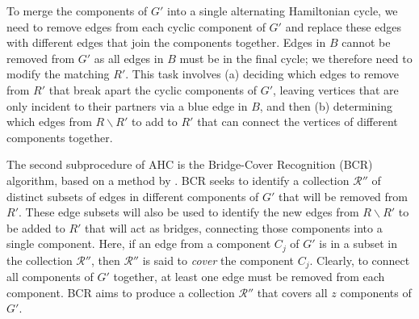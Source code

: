 \documentclass[a4paper,11pt,authoryear]{elsarticle}
\begin{document}
\noindent To merge the components of $G'$ into a single alternating Hamiltonian cycle, we need to remove edges from each cyclic component of $G'$ and replace these edges with different edges that join the components together. Edges in $B$ cannot be removed from $G'$ as all edges in $B$ must be in the final cycle; we therefore need to modify the matching $R'$. This task involves (a) deciding which edges to remove from $R'$ that break apart the cyclic components of $G'$, leaving vertices that are only incident to their partners via a blue edge in $B$, and then (b) determining which edges from $R\backslash R'$ to add to $R'$ that can connect the vertices of different components together.

The second subprocedure of AHC is the Bridge-Cover Recognition (BCR) algorithm, based on a method by \cite{becker2010}. BCR seeks to identify a collection $\mathcal{R}''$ of distinct subsets of edges in different components of $G'$ that will be removed from $R'$. These edge subsets will also be used to identify the new edges from $R \backslash R'$ to be added to $R'$ that will act as bridges, connecting those components into a single component. Here, if an edge from a component $C_j$ of $G'$ is in a subset in the collection $\mathcal{R}''$, then $\mathcal{R}''$ is said to \emph{cover} the component $C_j$. Clearly, to connect all components of $G'$ together, at least one edge must be removed from each component. BCR aims to produce a collection $\mathcal{R}''$ that covers all $z$ components of $G'$. %

\end{document}
